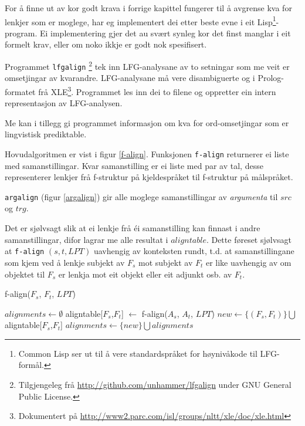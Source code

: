 \documentclass[11pt,a4paper,oneside,draft]{book}
\begin{document}
For å finne ut av kor godt krava i forrige kapittel fungerer til å
avgrense kva for lenkjer som er moglege, har eg implementert dei etter
beste evne i eit Lisp\footnote{Common Lisp ser ut til å vere standardspråket for høynivåkode
        til LFG-formål. }-program. Ei implementering gjer det au
svært synleg kor det finst manglar i eit formelt krav, eller om noko
ikkje er godt nok spesifisert.

Programmet \texttt{lfgalign} \footnote{Tilgjengeleg frå \href{http://github.com/unhammer/lfgalign}{http://github.com/unhammer/lfgalign} under GNU
       General Public License. } tek inn LFG-analysane av to setningar som
me veit er omsetjingar av kvarandre. LFG-analysane må vere
disambiguerte og i Prolog-formatet frå XLE\footnote{Dokumentert på \href{http://www2.parc.com/isl/groups/nltt/xle/doc/xle.html}{http://www2.parc.com/isl/groups/nltt/xle/doc/xle.html} }. Programmet les inn
dei to filene og oppretter ein intern representasjon av LFG-analysen.

Me kan i tillegg gi programmet informasjon om kva for ord-omsetjingar
som er lingvistisk prediktable.

Hovudalgoritmen er vist i figur \ref{f-align}. Funksjonen \texttt{f-align}
returnerer ei liste med samanstillingar. Kvar samanstilling er ei
liste med par av tal, desse representerer lenkjer frå f-struktur på
kjeldespråket til f-struktur på målspråket. 

\texttt{argalign} (figur \ref{argalign}) gir alle moglege samanstillingar av
\emph{argumenta} til $src$ og $trg$.

Det er sjølvsagt slik at ei lenkje frå éi samanstilling kan finnast i
andre samanstillingar, difor lagrar me alle resultat i
$aligntable$. Dette føreset sjølvsagt at \texttt{f-align} $(s,t,LPT)$
uavhengig av konteksten rundt, t.d. at samanstillingane som kjem ved å
lenkje subjekt av $F_s$ mot subjekt av $F_t$ er like uavhengig av om
objektet til $F_s$ er lenkja mot eit objekt eller eit adjunkt osb. av
$F_t$. 

  
    \begin{function}[]
    \caption{f-align($F_s$, $F_t$, $LPT$)}
    \label{f-align}
    
    $alignments \gets \emptyset$  \;
     {
        {
          {
         aligntable[$F_s$,$F_t$] $\gets$ f-align($A_s$, $A_t$, $LPT$)\;
         }
         $new \gets \{ (F_s, F_t) \} \bigcup$ aligntable[$F_s$,$F_t$] \;
         $alignments \gets \{ new \} \bigcup alignments$\;
       }
     }
     \end{function}
  
\end{document}
